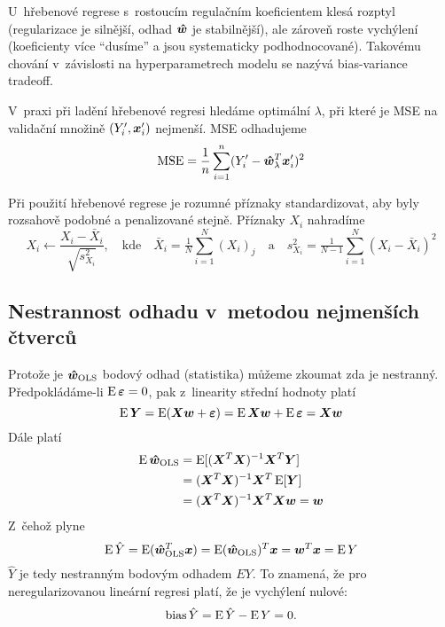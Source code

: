 U~hřebenové regrese s~rostoucím regulačním koeficientem klesá rozptyl (regularizace je silnější, odhad $\bm{\hat{w}}$ je stabilnější), ale zároveň roste vychýlení (koeficienty více ``dusíme'' a jsou systematicky podhodnocované). Takovému chování v~závislosti na hyperparametrech modelu se nazývá bias-variance tradeoff.

V~praxi při ladění hřebenové regresi hledáme optimální $\lambda$, při které je MSE na validační množině $(Y'_i, \bm{x}'_i)$ nejmenší. MSE odhadujeme
\[\operatorname{MSE} = \frac{1}{n} \sum_{i=1}^{n} (Y'_i - \bm{\hat{w}}_\lambda^T\bm{x}'_i)^2\]

Při použití hřebenové regrese je rozumné příznaky standardizovat, aby byly rozsahově podobné a penalizované stejně. Příznaky $X_i$ nahradíme
\[
    X_i \leftarrow \frac{X_i - \bar{X}_i}{\sqrt{s_{X_i}^2}},
    \quad \text{kde} \quad
    \bar{X}_i = \tfrac{1}{N} \sum_{i=1}^{N} (X_i)_j
    \quad \text{a} \quad
    s_{X_i}^2 = \tfrac{1}{N-1} \sum_{i=1}^{N} (X_i - \bar{X}_i)^2
\]

\subsection{Nestrannost odhadu v~metodou nejmenších čtverců}

Protože je $\bm{\hat{w}}_{\text{OLS}}$ bodový odhad (statistika) můžeme zkoumat zda je nestranný. Předpokládáme-li $\operatorname{E} \bm{\varepsilon} = 0$, pak z~linearity střední hodnoty platí
\[
    \operatorname{E} \bm{Y} = \operatorname{E}(\bm{X}\bm{w} + \bm{\varepsilon})
    = \operatorname{E}\bm{X}\bm{w} + \operatorname{E}\bm{\varepsilon}
    = \bm{X}\bm{w}
\]
Dále platí
\begin{align*}
    \operatorname{E}\bm{\hat{w}}_{\text{OLS}}
     & = \operatorname{E}[(\bm{X}^T\bm{X})^{-1}\bm{X}^T\bm{Y}]      \\
     & = (\bm{X}^T\bm{X})^{-1}\bm{X}^T\operatorname{E}[\bm{Y}]      \\
     & = (\bm{X}^T\bm{X})^{-1}\bm{X}^T\bm{X}\bm{w} = \bm{w}
\end{align*}
Z~čehož plyne
\[
    \operatorname{E} \hat{Y} = \operatorname{E}(\bm{\hat{w}}_{\text{OLS}}^T\bm{x}) = \operatorname{E}(\bm{\hat{w}}_{\text{OLS}})^T\bm{x} = \bm{w}^T\bm{x} = \operatorname{E} Y
\]
$\hat{Y}$ je tedy nestranným bodovým odhadem $EY$. To znamená, že pro neregularizovanou lineární regresi platí, že je vychýlení nulové:
\[\text{bias}\,\hat{Y} = \operatorname{E}\hat{Y} - \operatorname{E} Y = 0.\]
